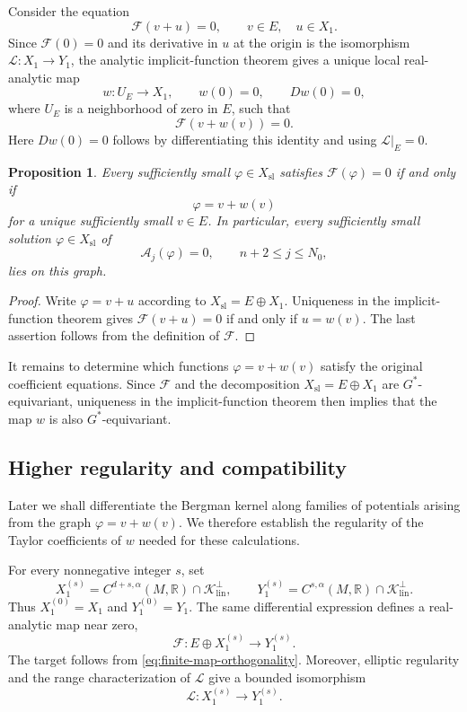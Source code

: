 \documentclass[11pt,reqno]{amsart}
\theoremstyle{corollary}
\theoremstyle{conjecture}
\theoremstyle{assumption}
\theoremstyle{proposition}
\newtheorem{proposition}[theorem]{Proposition}
\theoremstyle{remark}
\numberwithin{equation}{section}
\begin{document}
Consider the equation
\[
\mathcal F(v+u)=0,\qquad v\in E,\quad u\in X_1.
\]
Since $\mathcal F(0)=0$ and its derivative in $u$ at the origin is the isomorphism $\mathcal L\colon X_1\to Y_1$, the analytic implicit-function theorem gives a unique local real-analytic map
\[
w\colon U_E\longrightarrow X_1,\qquad w(0)=0,\qquad Dw(0)=0,
\]
where $U_E$ is a neighborhood of zero in $E$, such that
\[
\mathcal F(v+w(v))=0.
\]
Here $Dw(0)=0$ follows by differentiating this identity and using $\mathcal L|_E=0$.

\begin{proposition}\label{prop:finite-dimensional-graph}
Every sufficiently small $\varphi\in X_{\mathrm{sl}}$ satisfies $\mathcal F(\varphi)=0$ if and only if
\[
\varphi=v+w(v)
\]
for a unique sufficiently small $v\in E$. In particular, every sufficiently small solution $\varphi\in X_{\mathrm{sl}}$ of
\[
\mathcal A_j(\varphi)=0,\qquad n+2\leq j\leq N_0,
\]
lies on this graph.
\end{proposition}

\begin{proof}
Write $\varphi=v+u$ according to $X_{\mathrm{sl}}=E\oplus X_1$. Uniqueness in the implicit-function theorem gives $\mathcal F(v+u)=0$ if and only if $u=w(v)$. The last assertion follows from the definition of $\mathcal F$.
\end{proof}
It remains to determine which functions $\varphi=v+w(v)$ satisfy the original coefficient equations. Since $\mathcal F$ and the decomposition $X_{\mathrm{sl}}=E\oplus X_1$ are $G^*$-equivariant, uniqueness in the implicit-function theorem then implies that the map $w$ is also $G^*$-equivariant.

\subsection{Higher regularity and compatibility}
\label{subsec:regularity-compatibility}

Later we shall differentiate the Bergman kernel along families of potentials arising from the graph $\varphi=v+w(v)$. We therefore establish the regularity of the Taylor coefficients of $w$ needed for these calculations.

For every nonnegative integer $s$, set
\[
X_1^{(s)}=C^{d+s,\alpha}(M,\mathbb R)\cap\mathcal K_{\operatorname{lin}}^\perp,\qquad Y_1^{(s)}=C^{s,\alpha}(M,\mathbb R)\cap\mathcal K_{\operatorname{lin}}^\perp.
\]
Thus $X_1^{(0)}=X_1$ and $Y_1^{(0)}=Y_1$. The same differential expression defines a real-analytic map near zero,
\[
\mathcal F\colon E\oplus X_1^{(s)} \longrightarrow Y_1^{(s)}.
\]
The target follows from \eqref{eq:finite-map-orthogonality}. Moreover, elliptic regularity and the range characterization of $\mathcal L$ give a bounded isomorphism
\[
\mathcal L\colon X_1^{(s)} \longrightarrow Y_1^{(s)}.
\]
\end{document}
